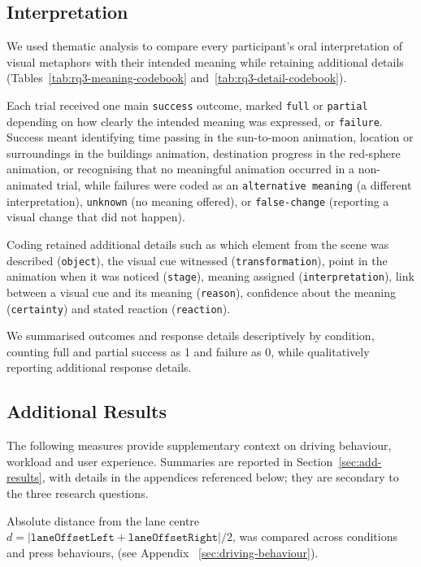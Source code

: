 \documentclass[
english,                 %
bibtex,                  %
includeExtraAbstracts, %
]{kththesis}
\numberwithin{listing}{chapter}
\begin{document}
\subsection{Interpretation}
\label{sec:interpretation}
We used thematic analysis to compare every participant's oral interpretation of visual metaphors with their intended meaning while retaining additional details (Tables~\ref{tab:rq3-meaning-codebook} and~\ref{tab:rq3-detail-codebook}).

Each trial received one main \texttt{success} outcome, marked \texttt{full} or \texttt{partial} depending on how clearly the intended meaning was expressed, or \texttt{failure}. Success meant identifying time passing in the sun-to-moon animation, location or surroundings in the buildings animation, destination progress in the red-sphere animation, or recognising that no meaningful animation occurred in a non-animated trial, while failures were coded as an \texttt{alternative meaning} (a different interpretation), \texttt{unknown} (no meaning offered), or \texttt{false-change} (reporting a visual change that did not happen). 

Coding retained additional details such as which element from the scene was described (\texttt{object}), the visual cue witnessed (\texttt{transformation}), point in the animation when it was noticed (\texttt{stage}), meaning assigned (\texttt{interpretation}), link between a visual cue and its meaning (\texttt{reason}), confidence about the meaning (\texttt{certainty}) and stated reaction (\texttt{reaction}).

We summarised outcomes and response details descriptively by condition, counting full and partial success as 1 and failure as 0, while qualitatively reporting additional response details.

\subsection{Additional Results}
\label{sec:additional-results}

The following measures provide supplementary context on driving behaviour, workload and user experience. Summaries are reported in Section~\ref{sec:add-results}, with details in the appendices referenced below; they are secondary to the three research questions.

Absolute distance from the lane centre \(d = |\texttt{laneOffsetLeft} + \texttt{laneOffsetRight}|/2\), was compared across conditions and press behaviours, (see Appendix ~\ref{sec:driving-behaviour}).
\end{document}
